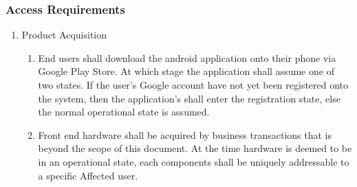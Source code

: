 \subsubsection{Access Requirements}
\begin{enumerate}
	\item{Product Acquisition}
	\begin{enumerate}
		\item End users shall download the android application onto their phone via Google Play Store. At which stage the application shall assume one of two states.
		If the user's Google account have not yet been registered onto the system, then the application's shall enter the registration state, else the normal operational state is assumed.
		\item Front end hardware shall be acquired by business transactions that is beyond the scope of this document. At the time hardware is deemed to be in an operational state, each components shall be uniquely addressable to a specific Affected user.
	\end{enumerate}
	

\end{enumerate}
